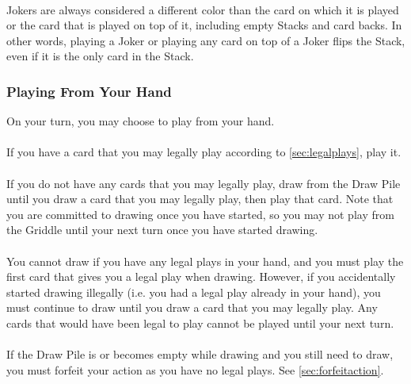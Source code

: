 \documentclass{article}
\begin{document}
\paragraph{\label{par:joker}}
Jokers are always considered a different color than the card on which it is played or the card that is played on top of it, including empty Stacks and card backs.
In other words, playing a Joker or playing any card on top of a Joker flips the Stack, even if it is the only card in the Stack.

\subsubsection{Playing From Your Hand \label{sec:fromhand}}

On your turn, you may choose to play from your hand.

\paragraph{\label{par:playifpossible}}
If you have a card that you may legally play according to \autoref{sec:legalplays}, play it.

\paragraph{\label{par:draw}}
If you do not have any cards that you may legally play, draw from the Draw Pile until you draw a card that you may legally play, then play that card. Note that you are committed to drawing once you have started, so you may not play from the Griddle until your next turn once you have started drawing.

\paragraph{\label{par:drawrestrictions}}
You cannot draw if you have any legal plays in your hand, and you must play the first card that gives you a legal play when drawing.
However, if you accidentally started drawing illegally (i.e. you had a legal play already in your hand), you must continue to draw until you draw a card that you may legally play. Any cards that would have been legal to play cannot be played until your next turn.

\paragraph{\label{par:emptydrawpile}}
If the Draw Pile is or becomes empty while drawing and you still need to draw, you must forfeit your action as you have no legal plays. See \autoref{sec:forfeitaction}.
\end{document}
